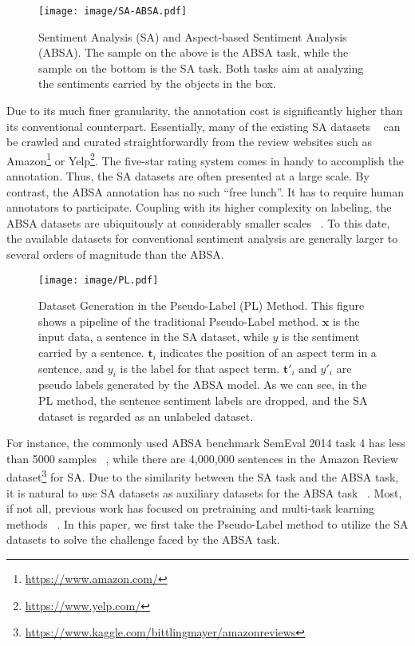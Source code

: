 \documentclass[11pt]{article}
\newcommand{\bx}{\mathbf{x}}
\newcommand{\bt}{\mathbf{t}}
\begin{document}
\begin{figure}
  \centering
  \texttt{[image: image/SA-ABSA.pdf]}
  \caption{Sentiment Analysis (SA) and Aspect-based Sentiment Analysis (ABSA). The sample on the above is the ABSA task, while the sample on the bottom is the SA task. Both tasks aim at analyzing the sentiments carried by the objects in the box.}
  \label{fig:sa-absa}
\end{figure}

Due to its much finer granularity, the annotation cost is significantly higher than its conventional counterpart. Essentially, many of the existing SA datasets ~\cite{he2018exploiting} can be crawled and curated straightforwardly from the review websites such as Amazon\footnote{\url{https://www.amazon.com/}} or Yelp\footnote{\url{https://www.yelp.com/}}. The five-star rating system comes in handy to accomplish the annotation. Thus, the SA datasets are often presented at a large scale.
By contrast, the ABSA annotation has no such ``free lunch''. It has to require human annotators to participate. Coupling with its higher complexity on labeling, the ABSA datasets are ubiquitously at considerably smaller scales ~\cite{pontikisemeval,he2018exploiting,yu2021cross}.
To this date, the available datasets for conventional sentiment analysis are generally larger to several orders of magnitude than the ABSA. 
\begin{figure*}
  \centering
  \texttt{[image: image/PL.pdf]} 
  \caption{Dataset Generation in the Pseudo-Label (PL) Method.
  This figure shows a pipeline of the traditional Pseudo-Label method.
  $\bx$ is the input data, a sentence in the SA dataset, while $y$ is the sentiment carried by a sentence. $\bt_i$ indicates the position of an aspect term in a sentence, and $y_i$ is the label for that aspect term. $\bt'_i$ and $y'_i$ are pseudo labels generated by the ABSA model.
  As we can see, in the PL method, the sentence sentiment labels are dropped, and the SA dataset is regarded as an unlabeled dataset.}
  \label{fig:pl}
\end{figure*}

For instance, the commonly used ABSA benchmark SemEval 2014 task 4 has less than 5000 samples ~\cite{pontikisemeval}, while there are 4,000,000 sentences in the Amazon Review dataset\footnote{\url{https://www.kaggle.com/bittlingmayer/amazonreviews}} for SA.
Due to the similarity between the SA task and the ABSA task, it is natural to use SA datasets as auxiliary datasets for the ABSA task ~\cite{he2018exploiting}. 
Most, if not all,  previous work has focused on pretraining and multi-task learning methods ~\cite{he2018exploiting,he2019interactive}.
In this paper, we first take the Pseudo-Label method to utilize the SA datasets to solve the challenge faced by the ABSA task.
\end{document}
